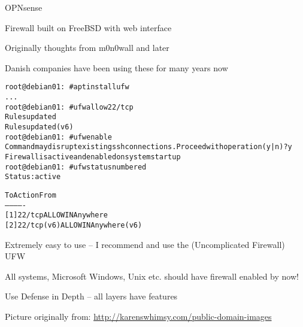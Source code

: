 \documentclass[Screen16to9,17pt]{foils}
\begin{document}


\begin{list1}
\item OPNsense 
\item Firewall built on FreeBSD with web interface
\item Originally thoughts from m0n0wall and later \\
\item Danish companies have been using these for many years now
\end{list1}



\begin{alltt}\footnotesize
root@debian01:~# apt install ufw
...
root@debian01:~# ufw allow 22/tcp
Rules updated
Rules updated (v6)
root@debian01:~# ufw enable
Command may disrupt existing ssh connections. Proceed with operation (y|n)? y
Firewall is active and enabled on system startup
root@debian01:~# ufw status numbered
Status: active

     To                         Action      From
     --                         ------      ----
[ 1] 22/tcp                     ALLOW IN    Anywhere
[ 2] 22/tcp (v6)                ALLOW IN    Anywhere (v6)
\end{alltt}

\begin{list2}
\item Extremely easy to use -- I recommend and use the (Uncomplicated Firewall) UFW
\item All systems, Microsoft Windows, Unix etc. should have firewall enabled by now!
\end{list2}



\centerline{Use Defense in Depth -- all layers have features}


\centerline{Picture originally from: \url{http://karenswhimsy.com/public-domain-images}}




\end{document}
